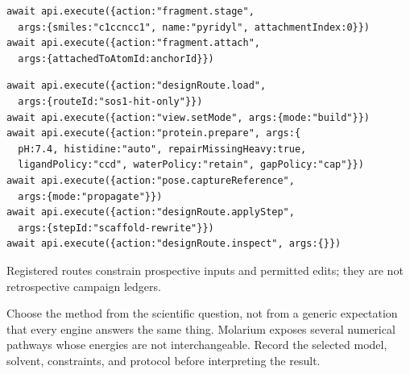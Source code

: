 \documentclass[11pt]{article}
\begin{document}
\begin{lstlisting}
await api.execute({action:"fragment.stage",
  args:{smiles:"c1ccncc1", name:"pyridyl", attachmentIndex:0}})
await api.execute({action:"fragment.attach",
  args:{attachedToAtomId:anchorId}})
\end{lstlisting}

\begin{lstlisting}
await api.execute({action:"designRoute.load",
  args:{routeId:"sos1-hit-only"}})
await api.execute({action:"view.setMode", args:{mode:"build"}})
await api.execute({action:"protein.prepare", args:{
  pH:7.4, histidine:"auto", repairMissingHeavy:true,
  ligandPolicy:"ccd", waterPolicy:"retain", gapPolicy:"cap"}})
await api.execute({action:"pose.captureReference",
  args:{mode:"propagate"}})
await api.execute({action:"designRoute.applyStep",
  args:{stepId:"scaffold-rewrite"}})
await api.execute({action:"designRoute.inspect", args:{}})
\end{lstlisting}

Registered routes constrain prospective inputs and permitted edits; they are not retrospective campaign ledgers.


Choose the method from the scientific question, not from a generic expectation that every engine answers the same thing. Molarium exposes several numerical pathways whose energies are not interchangeable. Record the selected model, solvent, constraints, and protocol before interpreting the result.
\end{document}
